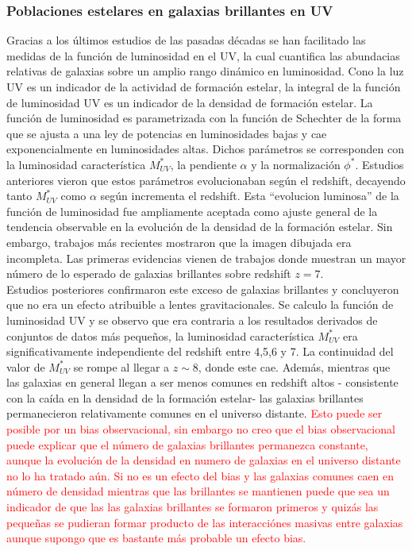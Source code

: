 \documentclass{article}
\begin{document}
\subsubsection*{Poblaciones estelares en galaxias brillantes en UV}
Gracias a los últimos estudios de las pasadas décadas se han facilitado las medidas de la función de luminosidad en el UV, la cual cuantifica las abundacias relativas de galaxias sobre un amplio rango dinámico en luminosidad. Cono la luz UV es un indicador de la actividad de formación estelar, la integral de la función de luminosidad UV es un indicador de la densidad de formación estelar. La función de luminosidad es parametrizada con la función de Schechter de la forma que se ajusta a una ley de potencias en luminosidades bajas y cae exponencialmente en luminosidades altas. Dichos parámetros se corresponden con la luminosidad característica $M_{UV}^*$, la pendiente $\alpha$ y la normalización $\phi^*$. Estudios anteriores vieron que estos parámetros evolucionaban según el redshift, decayendo tanto $M_{UV}^*$ como $\alpha$ según incrementa el redshift. Esta ``evolucion luminosa'' de la función de luminosidad fue ampliamente aceptada como ajuste general de la tendencia observable en la evolución de la densidad de la formación estelar. Sin embargo, trabajos más recientes mostraron que la imagen dibujada era incompleta. Las primeras evidencias vienen de trabajos donde muestran un mayor número de lo esperado de galaxias brillantes sobre redshift $z=7$. \\

Estudios posteriores confirmaron este exceso de galaxias brillantes y concluyeron que no era un efecto atribuible a lentes gravitacionales. Se calculo la función de luminosidad UV y se observo que era contraria a los resultados derivados de conjuntos de datos más pequeños, la luminosidad característica $M_{UV}^*$ era significativamente independiente del redshift entre 4,5,6 y 7. La continuidad del valor de $M_{UV}^*$ se rompe al llegar a $z\sim 8$, donde este cae. Además, mientras que las galaxias en general llegan a ser menos comunes en redshift altos - consistente con la caída en la densidad de la formación estelar- las galaxias brillantes permanecieron relativamente comunes en el universo distante. \textcolor{red}{Esto puede ser posible por un bias observacional, sin embargo no creo que el bias observacional puede explicar que el número de galaxias brillantes permanezca constante, aunque la evolución de la densidad en numero de galaxias en el universo distante no lo ha tratado aún. Si no es un efecto del bias y las galaxias comunes caen en número de densidad mientras que las brillantes se mantienen puede que sea un indicador de que las las galaxias brillantes se formaron primeros y quizás las pequeñas se pudieran formar producto de las interacciónes masivas entre galaxias aunque supongo que es bastante más probable un efecto bias.}\\
\end{document}
